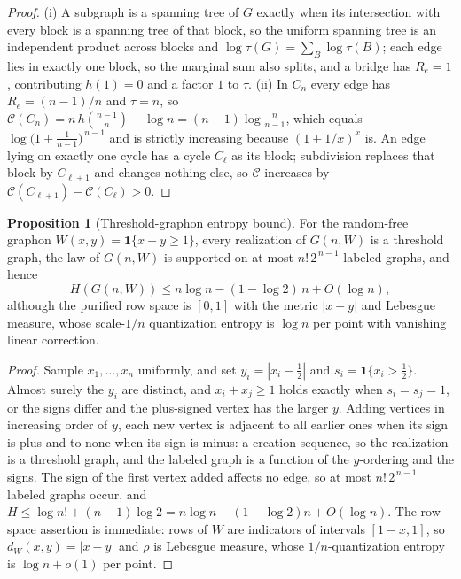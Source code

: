 \documentclass[11pt]{article}
\theoremstyle{definition}
\newtheorem{proposition}{Proposition}
\begin{document}
\begin{proof}
(i) A subgraph is a spanning tree of $G$ exactly when its intersection with every block is a spanning tree of that block, so the uniform spanning tree is an independent product across blocks and $\log\tau(G)=\sum_B\log\tau(B)$; each edge lies in exactly one block, so the marginal sum also splits, and a bridge has $R_e=1$, contributing $h(1)=0$ and a factor $1$ to $\tau$.  (ii) In $C_n$ every edge has $R_e=(n-1)/n$ and $\tau=n$, so
$\mathcal C(C_n)=n\,h\!\left(\tfrac{n-1}n\right)-\log n=(n-1)\log\tfrac n{n-1}$,
which equals $\log\bigl(1+\tfrac1{n-1}\bigr)^{\,n-1}$ and is strictly increasing because $(1+1/x)^x$ is.  An edge lying on exactly one cycle has a cycle $C_\ell$ as its block; subdivision replaces that block by $C_{\ell+1}$ and changes nothing else, so $\mathcal C$ increases by $\mathcal C(C_{\ell+1})-\mathcal C(C_\ell)>0$.
\end{proof}

\begin{proposition}[Threshold-graphon entropy bound]\label{ac:threshold}
For the random-free graphon $W(x,y)=\mathbf 1\{x+y\ge1\}$, every realization of $G(n,W)$ is a threshold graph, the law of $G(n,W)$ is supported on at most $n!\,2^{\,n-1}$ labeled graphs, and hence
\[
H(G(n,W))\le n\log n-(1-\log2)\,n+O(\log n),
\]
although the purified row space is $[0,1]$ with the metric $|x-y|$ and Lebesgue measure, whose scale-$1/n$ quantization entropy is $\log n$ per point with vanishing linear correction.
\end{proposition}

\begin{proof}
Sample $x_1,\ldots,x_n$ uniformly, and set $y_i=|x_i-\tfrac12|$ and $s_i=\mathbf 1\{x_i>\tfrac12\}$.  Almost surely the $y_i$ are distinct, and $x_i+x_j\ge1$ holds exactly when $s_i=s_j=1$, or the signs differ and the plus-signed vertex has the larger $y$.  Adding vertices in increasing order of $y$, each new vertex is adjacent to all earlier ones when its sign is plus and to none when its sign is minus: a creation sequence, so the realization is a threshold graph, and the labeled graph is a function of the $y$-ordering and the signs.  The sign of the first vertex added affects no edge, so at most $n!\,2^{\,n-1}$ labeled graphs occur, and
$H\le\log n!+(n-1)\log2=n\log n-(1-\log2)n+O(\log n)$.
The row space assertion is immediate: rows of $W$ are indicators of intervals $[1-x,1]$, so $d_W(x,y)=|x-y|$ and $\rho$ is Lebesgue measure, whose $1/n$-quantization entropy is $\log n+o(1)$ per point.
\end{proof}
\end{document}
